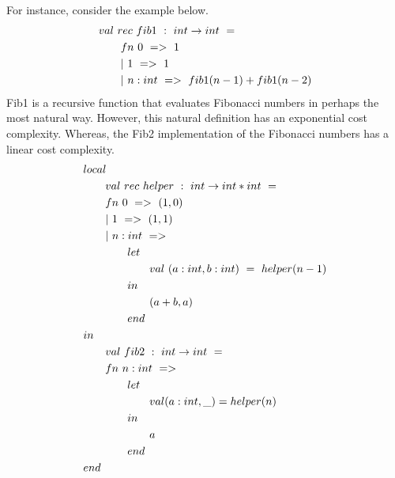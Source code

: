 \documentclass{article}
\begin{document}
\begin{itemize}
For instance, consider the example below.
\begin{align*}
&val~rec~fib1~:~int\rightarrow int~=\\
&\hspace*{2em} fn~0~=>~1\\
&\hspace*{2em} |~1~=>~1\\
&\hspace*{2em} |~n:int~=>~fib1(n-1)+fib1(n-2)
\end{align*}
Fib1 is a recursive function that evaluates Fibonacci numbers in perhaps the most natural way. However, this natural definition has an exponential cost complexity. Whereas, the Fib2 implementation of the Fibonacci numbers has a linear cost complexity. 
\begin{align*}
&local\\
&\hspace*{2em}val~rec~helper~:~int\rightarrow int*int~=\\
&\hspace*{2em}fn~0~=>~(1,0)\\
&\hspace*{2em}|~1~=>~(1,1)\\
&\hspace*{2em}|~n:int~=>\\
&\hspace*{4em}let\\
&\hspace*{6em}val~(a:int,b:int)~=~helper(n-1)\\
&\hspace*{4em}in\\
&\hspace*{6em}(a+b,a)\\
&\hspace*{4em}end\\
&in\\
&\hspace*{2em}val~fib2~:~int\rightarrow int~=\\
&\hspace*{2em}fn~n:int~=>\\
&\hspace*{4em}let\\
&\hspace*{6em}val (a:int,\_) = helper(n)\\
&\hspace*{4em}in\\
&\hspace*{6em}a\\
&\hspace*{4em}end\\
&end\\
\end{align*}
\end{itemize}


 
\end{document}
